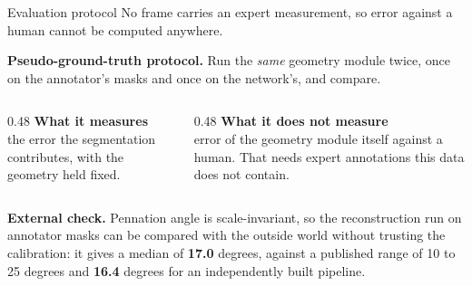 \documentclass[aspectratio=169,11pt]{beamer}
\newcommand{\num}[1]{\textcolor{Ink}{\textbf{#1}}}
\begin{document}
\begin{frame}{Evaluation protocol}
  No frame carries an expert measurement, so error against a human cannot be
  computed anywhere.
  \vspace{0.3cm}

  \begin{center}
  \colorbox{Ink!8}{\parbox{0.9\textwidth}{\centering
  \textbf{Pseudo-ground-truth protocol.} Run the \emph{same} geometry module
  twice, once on the annotator's masks and once on the network's, and compare.}}
  \end{center}
  \vspace{0.35cm}

  \begin{columns}[T]
  \begin{column}{0.48\textwidth}
    {\small\textbf{What it measures}\\
    the error the segmentation contributes, with the geometry held fixed.}
  \end{column}
  \begin{column}{0.48\textwidth}
    {\small\textbf{What it does not measure}\\
    error of the geometry module itself against a human. That needs expert
    annotations this data does not contain.}
  \end{column}
  \end{columns}
  \vspace{0.35cm}

  {\footnotesize \textbf{External check.} Pennation angle is scale-invariant, so
  the reconstruction run on annotator masks can be compared with the outside
  world without trusting the calibration: it gives a median of \num{17.0}
  degrees, against a published range of 10 to 25 degrees and \num{16.4} degrees
  for an independently built pipeline.}
\end{frame}
\end{document}
